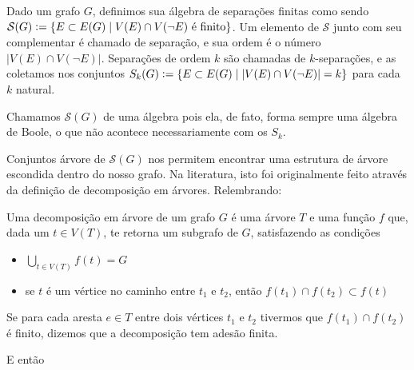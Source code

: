 \documentclass[11pt]{article}
\newcommand{\defeq}{\vcentcolon=}
\theoremstyle{definition}
\theoremstyle{definition}
\theoremstyle{definition}
\theoremstyle{definition}
\theoremstyle{definition}
\theoremstyle{definition}
\theoremstyle{definition}
\theoremstyle{definition}
\newtheorem*{definition*}{Definição}
\newenvironment{definicao*}{
\definecolor{shadecolor}{HTML}{defcfc}
\begin{shaded}
\begin{definition*}
}
{
\end{definition*}
\end{shaded}
}
\theoremstyle{definition}
\theoremstyle{definition}
\theoremstyle{definition}
\theoremstyle{definition}
\theoremstyle{definition}
\begin{document}
\begin{definicao*}
  Dado um grafo $G$, definimos sua álgebra de separações finitas como sendo $\mathcal{S}(G) \defeq \{E \subset E(G) \mid V(E) \cap V(\lnot E) \text{ é finito} \} $. Um elemento de $\mathcal{S}$ junto com seu complementar é chamado de separação, e sua ordem é o número $|V(E) \cap V(\lnot E)|$. Separações de ordem $k$ são chamadas de $k$-separações, e as coletamos nos conjuntos $S_k(G) \defeq \{E \subset E(G) \mid |V(E) \cap V(\lnot E)| = k \} $ para cada $k$ natural.
\end{definicao*}

Chamamos $\mathcal{S}(G)$ de uma álgebra pois ela, de fato, forma sempre uma álgebra de Boole, o que não acontece necessariamente com os $S_k$.

Conjuntos árvore de $\mathcal{S}(G)$ nos permitem encontrar uma estrutura de árvore escondida dentro do nosso grafo. Na literatura, isto foi originalmente feito através da definição de decomposição em árvores. Relembrando:

\begin{definicao*}
  Uma decomposição em árvore de um grafo $G$ é uma árvore $T$ e uma função $f$ que, dada um $t \in V(T)$, te retorna um subgrafo de $G$, satisfazendo as condições
  \begin{itemize}[label=]
    \item $\bigcup\limits_{t \in V(T)}^{}f(t) = G $
    \item se $t$ é um vértice no caminho entre $t_1$ e $t_2$, então $f(t_1) \cap f(t_2) \subset f(t)$
  \end{itemize}
  Se para cada aresta $e \in T$ entre dois vértices $t_1$ e $t_2$ tivermos que $f(t_1) \cap f(t_2)$ é finito, dizemos que a decomposição tem adesão finita.
\end{definicao*}

E então
\end{document}
